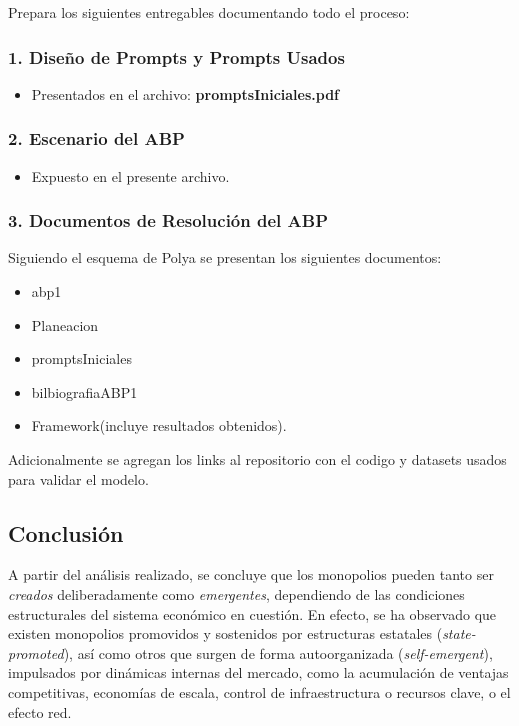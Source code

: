 \documentclass[a4paper,12pt]{article}
\begin{document}
Prepara los siguientes entregables documentando todo el proceso:

\subsubsection*{1. Diseño de Prompts y Prompts Usados}


\begin{itemize}
    \item Presentados en el archivo: \textbf{promptsIniciales.pdf}
\end{itemize}


\subsubsection*{2. Escenario del ABP}

\begin{itemize}
    \item Expuesto en el presente archivo.
\end{itemize}

\subsubsection*{3. Documentos de Resolución del ABP}

Siguiendo el esquema de Polya se presentan los siguientes documentos:

\begin{itemize}
    \item abp1
    \item Planeacion
    \item promptsIniciales
    \item bilbiografiaABP1
    \item Framework(incluye resultados obtenidos).
\end{itemize}
Adicionalmente se agregan los links al repositorio con el codigo y datasets usados para validar el modelo.


\subsection*{Conclusión}

A partir del análisis realizado, se concluye que los monopolios pueden tanto ser \textit{creados} deliberadamente como \textit{emergentes}, dependiendo de las condiciones estructurales del sistema económico en cuestión. En efecto, se ha observado que existen monopolios promovidos y sostenidos por estructuras estatales (\textit{state-promoted}), así como otros que surgen de forma autoorganizada (\textit{self-emergent}), impulsados por dinámicas internas del mercado, como la acumulación de ventajas competitivas, economías de escala, control de infraestructura o recursos clave, o el efecto red.
\end{document}

